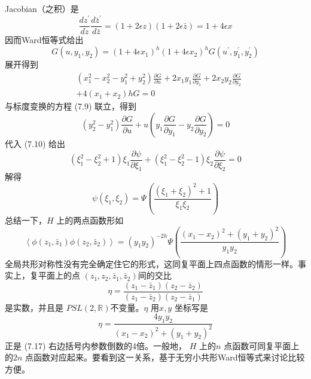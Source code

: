 Jacobian（之积）是
$$
\frac{d z^{\prime}}{d z} \frac{d \bar{z}^{\prime}}{d \bar{z}}=(1+2 \epsilon z)(1+2 \epsilon \bar{z})=1+4 \epsilon x
$$
因而Ward恒等式给出
\begin{equation}
	G\left(u, y_{1}, y_{2}\right)=\left(1+4 \epsilon x_{1}\right)^{h}\left(1+4 \epsilon x_{2}\right)^{h} G\left(u^{\prime}, y_{1}^{\prime}, y_{2}^{\prime}\right)
\end{equation}
展开得到
\begin{equation}
	\begin{aligned} &\left(x_{1}^{2}-x_{2}^{2}-y_{1}^{2}+y_{2}^{2}\right) \frac{\partial G}{\partial u}+2 x_{1} y_{1} \frac{\partial G}{\partial y_{1}}+2 x_{2} y_{2} \frac{\partial G}{\partial y_{2}} \\ &+4\left(x_{1}+x_{2}\right) h G=0 \end{aligned} 
\end{equation}
与标度变换的方程 (7.9) 联立，得到
\begin{equation}
	\left(y_{2}^{2}-y_{1}^{2}\right) \frac{\partial G}{\partial u}+u\left(y_{1} \frac{\partial G}{\partial y_{1}}-y_{2} \frac{\partial G}{\partial y_{2}}\right)=0 
\end{equation}
代入 (7.10) 给出
\begin{equation}
	\left(\xi_{1}^{2}-\xi_{2}^{2}+1\right) \xi_{1} \frac{\partial \psi}{\partial \xi_{1}}+\left(\xi_{1}^{2}-\xi_{2}^{2}-1\right) \xi_{2} \frac{\partial \psi}{\partial \xi_{2}}=0 
\end{equation}
解得
\begin{equation}
	\psi\left(\xi_{1}, \xi_{2}\right)=\Psi\left(\frac{\left(\xi_{1}+\xi_{2}\right)^{2}+1}{\xi_{1} \xi_{2}}\right) 
\end{equation}
总结一下，$ H$ 上的两点函数形如
\begin{equation}
	\left\langle\phi\left(z_{1}, \bar{z}_{1}\right) \phi\left(z_{2}, \bar{z}_{2}\right)\right\rangle=\left(y_{1} y_{2}\right)^{-2 h} \Psi\left(\frac{\left(x_{1}-x_{2}\right)^{2}+\left(y_{1}+y_{2}\right)^{2}}{y_{1} y_{2}}\right)
\end{equation}
全局共形对称性没有完全确定住它的形式，这同复平面上四点函数的情形一样。事实上，复平面上的点 $\left(z_{1}, z_{2}, \bar{z}_{1}, \bar{z}_{2}\right) $间的交比
\begin{equation}
	\eta=\frac{\left(z_{1}-\bar{z}_{1}\right)\left(z_{2}-\bar{z}_{2}\right)}{\left(z_{1}-\bar{z}_{2}\right)\left(z_{2}-\bar{z}_{1}\right)} 
\end{equation}
是实数，并且是 $PSL(2, \mathbb{R}) $不变量。$ \eta$ 用$ x,y$ 坐标写是
\begin{equation}
	\eta=\frac{4 y_{1} y_{2}}{\left(x_{1}-x_{2}\right)^{2}+\left(y_{1}+y_{2}\right)^{2}} 
\end{equation}
正是 (7.17) 右边括号内参数倒数的4倍。一般地， $H$ 上的$ n$ 点函数可同复平面上的$ 2n$ 点函数对应起来。要看到这一关系，基于无穷小共形Ward恒等式来讨论比较方便。
